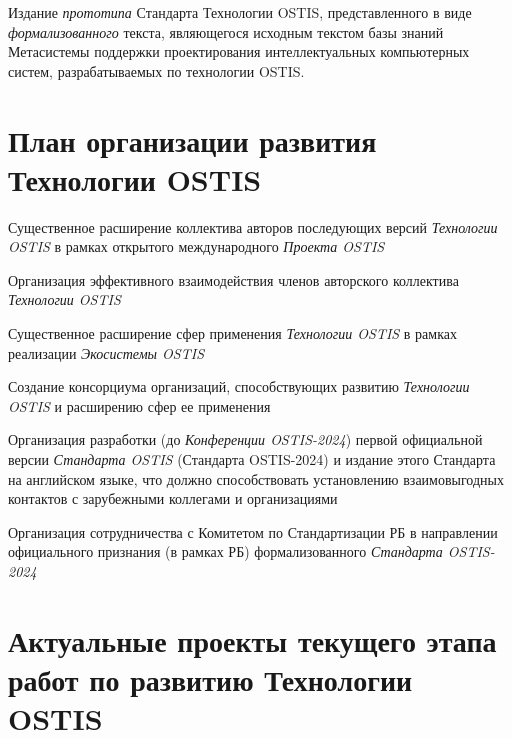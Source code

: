 Издание \textit{прототипа} Стандарта Технологии OSTIS, представленного в виде \textit{формализованного} текста, являющегося исходным текстом базы знаний Метасистемы поддержки проектирования интеллектуальных компьютерных систем, разрабатываемых по технологии OSTIS.

\section*{План организации развития Технологии OSTIS}
\label{concl_ostis_plan}

\begin{textitemize}
	\item
	Существенное расширение коллектива авторов последующих версий \textit{Технологии OSTIS} в рамках открытого международного \textit{Проекта OSTIS}
	\item
	Организация эффективного взаимодействия членов авторского коллектива \textit{Технологии OSTIS}
	\item
	Существенное расширение сфер применения \textit{Технологии OSTIS} в рамках реализации \textit{Экосистемы OSTIS}
	\item
	Создание консорциума организаций, способствующих развитию \textit{Технологии OSTIS} и расширению сфер ее применения
	\item
	Организация разработки (до \textit{Конференции OSTIS-2024}) первой официальной версии  \textit{Стандарта OSTIS} (Стандарта OSTIS-2024) и издание этого Стандарта на английском языке, что должно способствовать установлению взаимовыгодных контактов с зарубежными коллегами и организациями
	\item
	Организация сотрудничества с Комитетом по Стандартизации РБ в направлении официального признания (в рамках РБ) формализованного \textit{Стандарта OSTIS-2024}
\end{textitemize}

\section*{Актуальные проекты текущего этапа работ по развитию Технологии OSTIS}
\label{concl_actual_projects_current_stage_work_development_technology}

